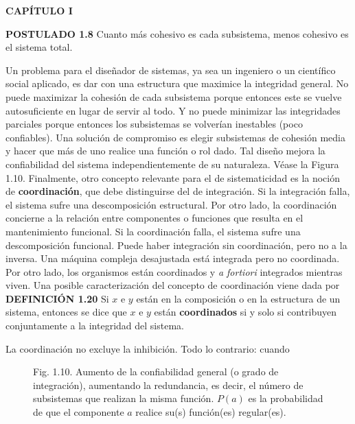 \newpage
\fancyhf{}
\fancyhead[l]{\thepage}
\begin{center}
{\fontsize{13}{16}\selectfont \textbf{CAPÍTULO I}}
\end{center}
\vspace{0.5cm}

{\fontsize{13}{15}\selectfont
\textbf{POSTULADO 1.8} Cuanto más cohesivo es cada subsistema, menos cohesivo es el sistema total.

Un problema para el diseñador de sistemas, ya sea un ingeniero o un científico social aplicado, es dar con una estructura que maximice la integridad general. No puede maximizar la cohesión de cada subsistema porque entonces este se vuelve autosuficiente en lugar de servir al todo. 
Y no puede minimizar las integridades parciales porque entonces los subsistemas se volverían inestables (poco confiables). Una solución de compromiso es elegir subsistemas de cohesión media y hacer que más de uno realice una función o rol dado. Tal diseño mejora la confiabilidad del sistema independientemente de su naturaleza. Véase la Figura 1.10.
Finalmente, otro concepto relevante para el de sistematicidad es la noción de \textbf{coordinación}, que debe distinguirse del de integración. Si la integración falla, el sistema sufre una descomposición estructural. 
Por otro lado, la coordinación concierne a la relación entre componentes o funciones que resulta en el mantenimiento funcional. Si la coordinación falla, el sistema sufre una descomposición funcional. Puede haber integración sin coordinación, pero no a la inversa. 
Una máquina compleja desajustada está integrada pero no coordinada. Por otro lado, los organismos están coordinados y \textit{a fortiori} integrados mientras viven. Una posible caracterización del concepto de coordinación viene dada por\\

\textbf{DEFINICIÓN 1.20} Si \( x \) e \( y \) están en la composición o en la estructura de un sistema, entonces se dice que \( x \) e \( y \) están \textbf{coordinados} si y solo si contribuyen conjuntamente a la integridad del sistema.

La coordinación no excluye la inhibición. Todo lo contrario: cuando
}

\begin{figure}[h!]
    \centering
    \caption*{Fig. 1.10. Aumento de la confiabilidad general (o grado de integración), aumentando la redundancia, es decir, el número de subsistemas que realizan la misma función. \( P(a) \) es la probabilidad de que el componente \( a \) realice su(s) función(es) regular(es).}
\end{figure}

